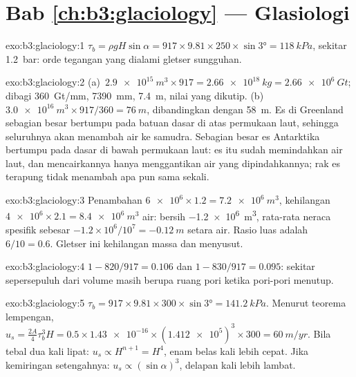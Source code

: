 \section*{Bab \ref{ch:b3:glaciology} --- Glasiologi}

\begin{solution}{exo:b3:glaciology:1}
$\tau_b = \rho gH\sin\alpha = 917\times9.81\times250\times\sin\ang{3} =
\qty{118}{kPa}$, sekitar \qty{1.2}{bar}: orde tegangan yang
dialami gletser sungguhan.
\end{solution}

\begin{solution}{exo:b3:glaciology:2}
(a)~$\qty{2.9e15}{m^3}\times917 = \qty{2.66e18}{kg} = \qty{2.66e6}{Gt}$;
dibagi \qty{360}{Gt/mm}, \qty{7390}{mm}, \qty{7.4}{m}, nilai yang dikutip.
(b)~$\qty{3.0e16}{m^3}\times917/360 = \qty{76}{m}$, dibandingkan dengan \qty{58}{m}.
Es di Greenland sebagian besar bertumpu pada batuan dasar di atas permukaan laut, sehingga seluruhnya
akan menambah air ke samudra. Sebagian besar es Antarktika bertumpu pada dasar di bawah
permukaan laut: es itu sudah memindahkan air laut, dan mencairkannya hanya menggantikan
air yang dipindahkannya; rak es terapung tidak menambah apa pun sama sekali.
\end{solution}

\begin{solution}{exo:b3:glaciology:3}
Penambahan $\num{6e6}\times1.2 = \qty{7.2e6}{m^3}$, kehilangan $\num{4e6}\times2.1 =
\qty{8.4e6}{m^3}$ air: bersih \qty{-1.2e6}{m^3}, rata-rata neraca spesifik
sebesar $-1.2\times10^6/10^7 = \qty{-0.12}{m}$ setara air.
Rasio luas  adalah $6/10 = 0.6$. Gletser ini kehilangan massa
dan menyusut.
\end{solution}

\begin{solution}{exo:b3:glaciology:4}
$1 - 820/917 = \num{0.106}$ dan $1 - 830/917 = \num{0.095}$: sekitar sepersepuluh
dari volume masih berupa ruang pori ketika pori-pori menutup.
\end{solution}

\begin{solution}{exo:b3:glaciology:5}
$\tau_b = 917\times9.81\times300\times\sin\ang{3} = \qty{141.2}{kPa}$. Menurut
teorema lempengan, $u_s = \tfrac{2A}{4}\tau_b^3H = 0.5\times\num{1.43e-16}
\times(\num{1.412e5})^3\times300 = \qty{60}{m/yr}$. Bila tebal dua kali lipat: $u_s
\propto H^{n+1} = H^4$, enam belas kali lebih cepat. Jika kemiringan setengahnya: $u_s \propto
(\sin\alpha)^3$, delapan kali lebih lambat.
\end{solution}

